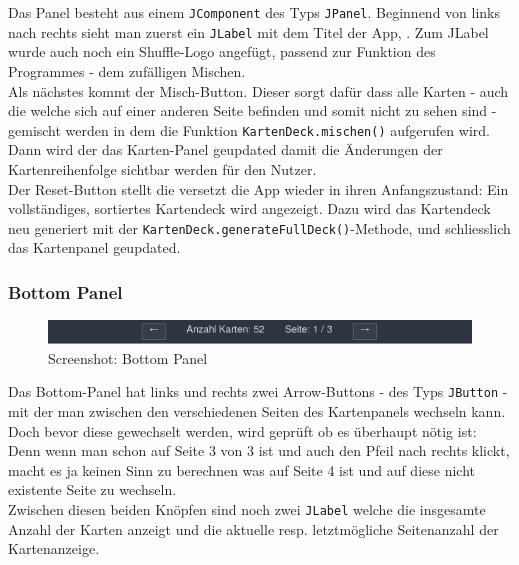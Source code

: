 \documentclass[a4paper,11pt]{article}
\begin{document}
Das Panel besteht aus einem \texttt{JComponent} des Typs \texttt{JPanel}. Beginnend von links nach rechts sieht man zuerst ein \texttt{JLabel} mit dem Titel der App, . Zum JLabel wurde auch noch ein Shuffle-Logo angefügt, passend zur Funktion des Programmes - dem zufälligen Mischen.\\

Als nächstes kommt der Misch-Button. Dieser sorgt dafür dass alle Karten - auch die welche sich auf einer anderen Seite befinden und somit nicht zu sehen sind - gemischt werden in dem die Funktion \texttt{KartenDeck.mischen()} aufgerufen wird. Dann wird der das Karten-Panel geupdated damit die Änderungen der Kartenreihenfolge sichtbar werden für den Nutzer.\\

Der Reset-Button stellt die versetzt die App wieder in ihren Anfangszustand: Ein vollständiges, sortiertes Kartendeck wird angezeigt. Dazu wird das Kartendeck neu generiert mit der \texttt{KartenDeck.generateFullDeck()}-Methode, und schliesslich das Kartenpanel geupdated.

\subsubsection{Bottom Panel}
\begin{figure}[H]
    \centering
    \includegraphics[width=.9\textwidth]{media/bottom-panel.jpg}
    \caption{Screenshot: Bottom Panel}
\end{figure}

Das Bottom-Panel hat links und rechts zwei Arrow-Buttons - des Typs \texttt{JButton} - mit der man zwischen den verschiedenen Seiten des Kartenpanels wechseln kann. Doch bevor diese gewechselt werden, wird geprüft ob es überhaupt nötig ist: Denn wenn man schon auf Seite 3 von 3 ist und auch den Pfeil nach rechts klickt, macht es ja keinen Sinn zu berechnen was auf Seite 4 ist und auf diese nicht existente Seite zu wechseln.\\

Zwischen diesen beiden Knöpfen sind noch zwei \texttt{JLabel} welche die insgesamte Anzahl der Karten anzeigt und die aktuelle resp. letztmögliche Seitenanzahl der Kartenanzeige.
\end{document}
